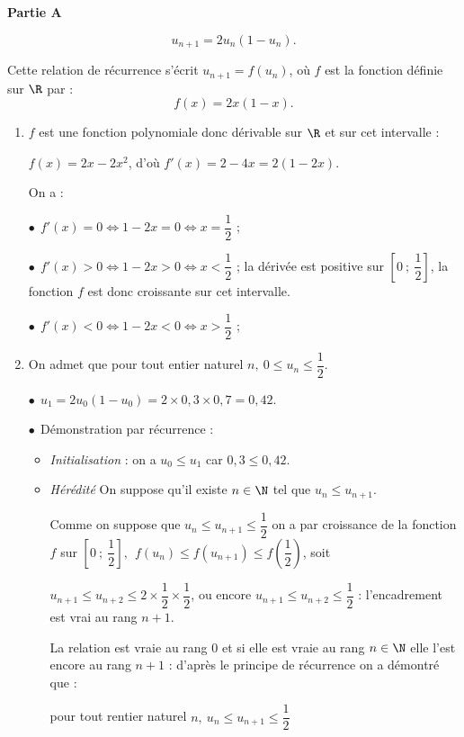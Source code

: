 \medskip

\textbf{Partie A}

\medskip


\[u_{n+1} =  2u_n\left(1 - u_n\right).\]

Cette relation de récurrence s'écrit $u_{n+1} =  f\left(u_n\right)$, où $f$ est la fonction définie sur $\R$ par :
\[f(x) = 2x(1 - x).\]

\smallskip
\begin{enumerate}
\item 
$f$ est une fonction polynomiale donc dérivable sur $\R$ et sur cet intervalle :

$f(x) = 2x - 2x^2$, d'où $f'(x) = 2 - 4x = 2(1 - 2x)$.

On a :

$\bullet~~$$f'(x) = 0 \iff 1 - 2x = 0 \iff x = \dfrac12$ ;

$\bullet~~$$f'(x) > 0 \iff 1 - 2x > 0 \iff x < \dfrac12$ ; la dérivée est positive sur $\left[0~;~\dfrac12\right]$, la fonction $f$ est donc croissante sur cet intervalle.

$\bullet~~$$f'(x) < 0 \iff 1 - 2x < 0 \iff x > \dfrac12$ ;
\item On admet que pour tout entier naturel $n,\:0 \leqslant u_n \leqslant \dfrac12$.


$\bullet~~$$u_1 = 2u_0\left(1 - u_0\right) = 2\times 0,3 \times 0,7= 0,42$.

$\bullet~~$Démonstration par récurrence :

\begin{itemize}
\item \emph{Initialisation} : on a $u_0 \leqslant u_1$ car $0,3 \leqslant 0,42$.
\item \emph{Hérédité} On suppose qu'il existe $n \in \N$  tel que $u_n \leqslant u_{n+1}$.

Comme on suppose que $u_n \leqslant u_{n+1} \leqslant \dfrac12$ on a par croissance de la fonction $f$ sur $\left[0~;~\dfrac12\right], \: \:f\left(u_n\right) \leqslant f\left(u_{n+1}\right) \leqslant f\left(\dfrac12\right)$, soit 

$u_{n+1} \leqslant u_{n+2} \leqslant 2 \times \dfrac12 \times \dfrac12$, ou encore $u_{n+1} \leqslant u_{n+2} \leqslant \dfrac12$ : l'encadrement est vrai au rang $n+1$.

La relation est vraie au rang 0 et si elle est vraie au rang $n \in \N$ elle l'est encore au rang $n + 1$ : d'après le principe de récurrence on a démontré que :

pour tout rentier naturel $n,\: u_n \leqslant u_{n+1} \leqslant \dfrac12$
\end{itemize}


\end{enumerate}
